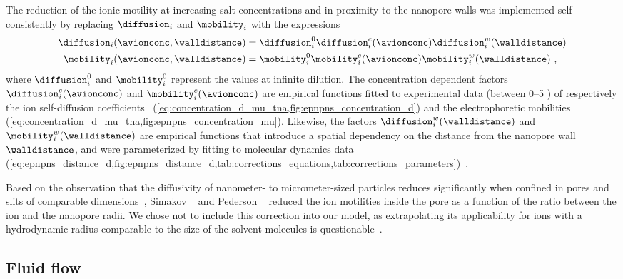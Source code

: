 The reduction of the ionic motility at increasing salt concentrations and in proximity to the nanopore walls
was implemented self-consistently by replacing $\diffusion_{i}$ and $\mobility_{i}$ with the expressions
%
\begin{align}\label{eq:epnp-ns_diffusion_and_mobility}
  \diffusion_{i}(\avionconc,\walldistance) ={}&
      \diffusion_{i}^0 \diffusion_{i}^c(\avionconc) \diffusion_{i}^w(\walldistance)  \\
  \mobility_{i}(\avionconc,\walldistance) ={}&
      \mobility_{i}^0 \mobility_{i}^c(\avionconc) \mobility_{i}^w(\walldistance)
  \text{ ,}
\end{align}
%
where $\diffusion_{i}^0$ and $\mobility_{i}^0$ represent the values at infinite dilution. The concentration
dependent factors $\diffusion_{i}^c(\avionconc)$ and $\mobility_{i}^c(\avionconc)$ are empirical functions
fitted to experimental data (between \SIrange{0}{5}{\Molar} ) of respectively the ion self-diffusion
coefficients~\cite{Mills-1989} (\cref{eq:concentration_d_mu_tna,fig:epnpns_concentration_d}) and the
electrophoretic mobilities~\cite{Bianchi-1989,Currie-1960,Goldsack-1976,DellaMonica-1979}
(\cref{eq:concentration_d_mu_tna,fig:epnpns_concentration_mu}). Likewise, the factors
$\diffusion_{i}^w(\walldistance)$ and $\mobility_{i}^w(\walldistance)$ are empirical functions that introduce
a spatial dependency on the distance from the nanopore wall $\walldistance$, and were parameterized by fitting
to molecular dynamics data
(\cref{eq:epnpns_distance_d,fig:epnpns_distance_d,tab:corrections_equations,tab:corrections_parameters})~\cite{Noskov-2004,Simakov-2010,Makarov-1998,Wilson-2019}.

Based on the observation that the diffusivity of nanometer- to micrometer-sized particles reduces
significantly when confined in pores and slits of comparable dimensions~\cite{Renkin-1954,Deen-1987,
Dechadilok-2006,Muthukumar-2014,Kannam-2017}, Simakov \etal{}~\cite{Simakov-2010} and Pederson
\etal{}~\cite{Pederson-2015} reduced the ion motilities inside the pore as a function of the ratio between the
ion and the nanopore radii. We chose not to include this correction into our model, as extrapolating its
applicability for ions with a hydrodynamic radius comparable to the size of the solvent molecules is
questionable~\cite{Anderson-1972,Deen-1987}.


\subsection{Fluid flow}
%

